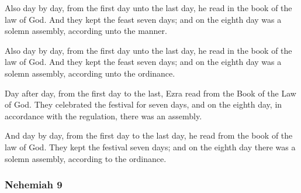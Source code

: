 			Also day by day, from the first day unto the last day, he read in the book of the law of God. And they kept the feast seven days; and on the eighth day was a solemn assembly, according unto the manner.

			\begin{versebox}
					\item[BHS] 
					\item[LXX] 
					\item[ASV] Also day by day, from the first day unto the last day, he read in the book of the law of God. And they kept the feast seven days; and on the eighth day was a solemn assembly, according unto the ordinance.
					\item[NIV] Day after day, from the first day to the last, Ezra read from the Book of the Law of God. They celebrated the festival for seven days, and on the eighth day, in accordance with the regulation, there was an assembly.
					\item[NRSV] And day by day, from the first day to the last day, he read from the book of the law of God. They kept the festival seven days; and on the eighth day there was a solemn assembly, according to the ordinance.
			\end{versebox}
	\subsubsection{Nehemiah 9} %
		\label{NEHEMIAH-9}

